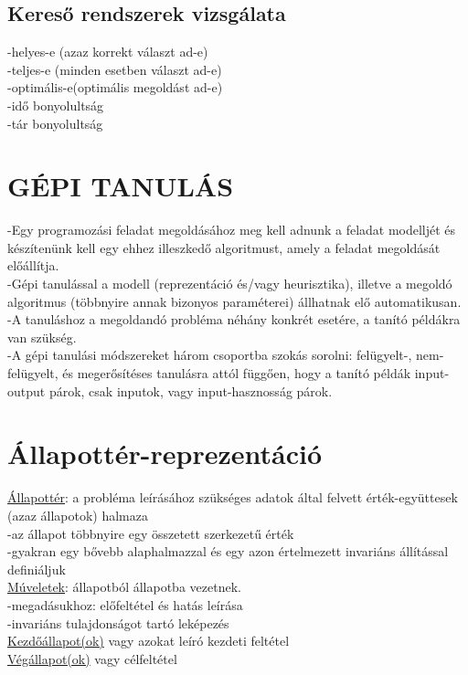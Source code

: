 \documentclass{article}
\begin{document}
	\subsection{Kereső rendszerek vizsgálata}
	-helyes-e (azaz korrekt választ ad-e)\\
	-teljes-e (minden esetben választ ad-e)\\
	-optimális-e(optimális megoldást ad-e)\\
	-idő bonyolultság\\
	-tár bonyolultság\\
	
	\section{GÉPI TANULÁS}
	-Egy programozási feladat megoldásához meg kell adnunk a feladat modelljét és készítenünk kell egy ehhez illeszkedő algoritmust, amely a feladat megoldását előállítja.\\
	-Gépi tanulással a modell (reprezentáció és/vagy heurisztika), illetve a megoldó algoritmus (többnyire annak bizonyos paraméterei) állhatnak elő automatikusan.\\
	-A tanuláshoz a megoldandó probléma néhány konkrét esetére, a tanító példákra van szükség.\\
	-A gépi tanulási módszereket három csoportba szokás sorolni: felügyelt-, nem-felügyelt, és megerősítéses tanulásra attól függően, hogy a tanító példák input-output párok, csak inputok, vagy input-hasznosság párok.\\
	
	\section{Állapottér-reprezentáció}
	\underline{Állapottér}: a probléma leírásához szükséges adatok által felvett érték-együttesek (azaz állapotok) halmaza\\
	-az állapot többnyire egy összetett szerkezetű érték\\
	-gyakran egy bővebb alaphalmazzal és egy azon értelmezett invariáns állítással definiáljuk\\
	\underline{Múveletek}: állapotból állapotba vezetnek.\\
	-megadásukhoz: előfeltétel és hatás leírása\\
	-invariáns tulajdonságot tartó leképezés\\
	\underline{Kezdőállapot(ok)} vagy azokat leíró kezdeti feltétel\\
	\underline{Végállapot(ok)} vagy célfeltétel
	
\end{document}
